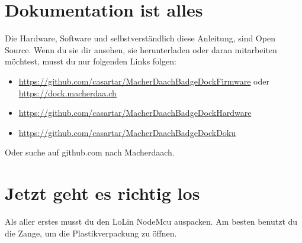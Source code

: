\documentclass{article}
\begin{document}
\section{Dokumentation ist alles}

Die Hardware, Software und selbstverständlich diese Anleitung, sind Open Source. Wenn du sie dir ansehen, sie herunterladen oder daran mitarbeiten möchtest, musst du nur folgenden Links folgen:

\begin{itemize}
	\item \url{https://github.com/casartar/MacherDaachBadgeDockFirmware} oder \url{https://dock.macherdaa.ch}
	\item \url{https://github.com/casartar/MacherDaachBadgeDockHardware}
	\item \url{https://github.com/casartar/MacherDaachBadgeDockDoku}
\end{itemize}

Oder suche auf github.com nach Macherdaach.

\section{Jetzt geht es richtig los}
Als aller erstes musst du den LoLin NodeMcu auspacken. Am besten benutzt du die Zange, um die Plastikverpackung zu öffnen.

\vspace{1cm}
\end{document}
